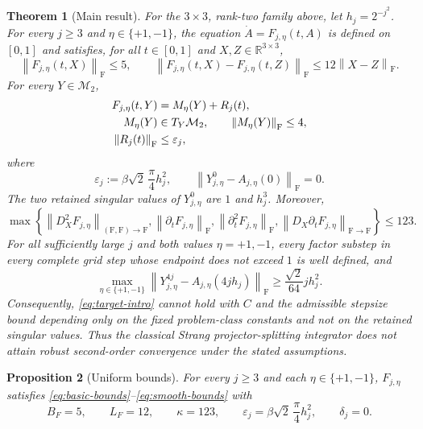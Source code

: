 \documentclass[10pt,a4paper]{amsart}
\numberwithin{equation}{section}
\newtheorem{theorem}{Theorem}[section]
\newtheorem{proposition}[theorem]{Proposition}
\newcommand{\F}{\mathrm F}
\newcommand{\norm}[1]{\left\lVert #1\right\rVert}
\newcommand{\eps}{\varepsilon}
\begin{document}
\begin{theorem}[Main result]
\label{thm:main}
For the $3\times3$, rank-two family above, let $h_j=2^{-j^2}$.  For every $j\ge3$ and
$\eta\in\{+1,-1\}$, the equation $\dot A=F_{j,\eta}(t,A)$ is defined
on $[0,1]$ and satisfies, for all $t\in[0,1]$ and
$X,Z\in\mathbb R^{3\times3}$,
\begin{equation}\label{eq:theorem-basic-bounds}
 \norm{F_{j,\eta}(t,X)}_{\F}\le5,
 \qquad
 \norm{F_{j,\eta}(t,X)-F_{j,\eta}(t,Z)}_{\F}
 \le12\norm{X-Z}_{\F}.
\end{equation}
For every $Y\in\mathcal M_2$,
\begin{align}
 F_{j,\eta}(t,Y)&=M_\eta(Y)+R_j(t),\notag\\
 M_\eta(Y)&\in T_Y\mathcal M_2,\qquad
 \norm{M_\eta(Y)}_{\F}\le4,\notag\\
 \norm{R_j(t)}_{\F}&\le\eps_j,
 \label{eq:theorem-normal-bound}
\end{align}
where
\begin{equation}\label{eq:theorem-epsilon}
 \eps_j:=\beta\sqrt2\,\frac\pi4h_j^2,
 \qquad
 \norm{Y^0_{j,\eta}-A_{j,\eta}(0)}_{\F}=0.
\end{equation}
The two retained singular values of $Y^0_{j,\eta}$ are $1$ and
$h_j^3$.
Moreover,
\begin{equation}\label{eq:theorem-smooth-bounds}
 \max\!\left\{
 \norm{D_X^2F_{j,\eta}}_{(\F,\F)\to\F},
 \norm{\partial_tF_{j,\eta}}_{\F},
 \norm{\partial_t^2F_{j,\eta}}_{\F},
 \norm{D_X\partial_tF_{j,\eta}}_{\F\to\F}
 \right\}\le123.
\end{equation}
For all sufficiently large $j$ and both values $\eta=+1,-1$, every
factor substep in every complete grid step whose endpoint does not
exceed $1$ is well defined, and
\begin{equation}\label{eq:main-lower}
 \max_{\eta\in\{+1,-1\}}
 \norm{Y_{j,\eta}^{4j}-A_{j,\eta}(4jh_j)}_{\F}
 \ge \frac{\sqrt2}{64}j h_j^2.
\end{equation}
Consequently, \eqref{eq:target-intro} cannot hold with $C$ and the
admissible stepsize bound depending only on the fixed problem-class
constants and not on the retained singular values.  Thus the classical
Strang projector-splitting integrator does not attain robust
second-order convergence under the stated assumptions.
\end{theorem}


\begin{proposition}[Uniform bounds]
\label{prop:family-bounds}
For every $j\ge3$ and each $\eta\in\{+1,-1\}$, $F_{j,\eta}$ satisfies
\eqref{eq:basic-bounds}--\eqref{eq:smooth-bounds} with
\begin{equation}\label{eq:fixed-constants}
 B_F=5,\qquad L_F=12,\qquad \kappa=123,
 \qquad \eps_j=\beta\sqrt2\,\frac{\pi}{4}h_j^2,
 \qquad \delta_j=0.
\end{equation}
\end{proposition}
\end{document}
